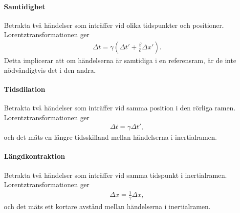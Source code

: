 \paragraph{Samtidighet}
Betrakta två händelser som inträffer vid olika tidspunkter och positioner. Lorentztransformationen ger
\begin{align*}
	\Delta t = \gamma(\Delta t' + \frac{\beta}{c}\Delta x').
\end{align*}
Detta implicerar att om händelserna är samtidiga i en referensram, är de inte nödvändigtvis det i den andra.

\paragraph{Tidsdilation}
Betrakta två händelser som inträffer vid samma position i den rörliga ramen. Lorentztransformationen ger
\begin{align*}
	\Delta t = \gamma\Delta t',
\end{align*}
och det mäts en längre tidsskilland mellan händelserna i inertialramen.

\paragraph{Längdkontraktion}
Betrakta två händelser som inträffer vid samma tidspunkt i inertialramen. Lorentztransformationen ger
\begin{align*}
	\Delta x = \frac{1}{\gamma}\Delta x,
\end{align*}
och det mäts ett kortare avstånd mellan händelserna i inertialramen.

